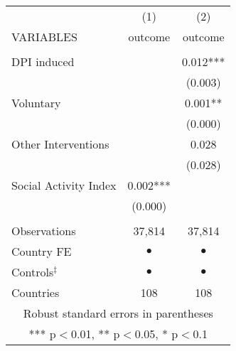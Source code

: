 \begin{tabular}{lcc} \hline
 & (1) & (2) \\
VARIABLES & outcome & outcome \\ \hline
 &  &  \\
DPI induced &  & 0.012*** \\
 &  & (0.003) \\
Voluntary &  & 0.001** \\
 &  & (0.000) \\
Other Interventions &  & 0.028 \\
 &  & (0.028) \\
Social Activity Index & 0.002*** &  \\
 & (0.000) &  \\
 &  &  \\
Observations & 37,814 & 37,814 \\
Country FE & $ \bullet $ & $ \bullet $ \\
Controls$^\ddag$ & $ \bullet $ & $ \bullet $ \\
 Countries & 108 & 108 \\ \hline
\multicolumn{3}{c}{ Robust standard errors in parentheses} \\
\multicolumn{3}{c}{ *** p$<$0.01, ** p$<$0.05, * p$<$0.1} \\
\end{tabular}
